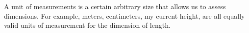 \documentclass[11pt,a4paper]{article}
\begin{document}

\begin{entry}
  A unit of measurements is a certain arbitrary size that allows us
  to assess dimensions.
  For example, meters, centimeters, my current height,
  are all equally valid units of measurement for the dimension of length.
\end{entry}

\begin{entry}

\end{entry}

\begin{entry}[]

\end{entry}
\end{document}
